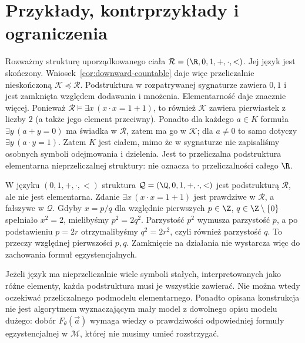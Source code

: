 \section{Przykłady, kontrprzykłady i ograniczenia}
\begin{przyklad}
\label{ex:ls-real-closed}
Rozważmy strukturę uporządkowanego ciała
$\mathcal R=(\R,0,1,+,\cdot,<)$.
Jej język jest skończony. Wniosek~\ref{cor:downward-countable}
daje więc przeliczalnie nieskończoną
$\mathcal K\preccurlyeq\mathcal R$.
Podstruktura w rozpatrywanej sygnaturze
zawiera $0,1$ i jest zamknięta
względem dodawania i mnożenia.
Elementarność daje znacznie więcej.
Ponieważ $\mathcal R\models\exists x\,(x\cdot x=1+1)$,
to również $\mathcal K$ zawiera pierwiastek
z liczby $2$ (a także jego element przeciwny).
Ponadto dla każdego $a\in K$
formuła $\exists y\,(a+y=0)$ ma świadka
w $\mathcal R$, zatem ma go w $\mathcal K$;
dla $a\ne0$ to samo dotyczy
$\exists y\,(a\cdot y=1)$.
Zatem $K$ jest ciałem, mimo że
w sygnaturze nie zapisaliśmy osobnych symboli
odejmowania i dzielenia.
Jest to przeliczalna podstruktura elementarna
nieprzeliczalnej struktury: nie oznacza to
przeliczalności całego $\R$.
\end{przyklad}

\begin{przyklad}
\label{ex:ls-q-not-elementary}
W języku $(0,1,+,\cdot,<)$ struktura
$\mathcal Q=(\Q,0,1,+,\cdot,<)$
jest podstrukturą $\mathcal R$,
ale nie jest elementarna.
Zdanie $\exists x\,(x\cdot x=1+1)$
jest prawdziwe w $\mathcal R$,
a fałszywe w $\mathcal Q$.
Gdyby $x=p/q$ dla względnie pierwszych
$p\in\Z$, $q\in\Z\setminus\{0\}$
spełniało $x^2=2$, mielibyśmy
$p^2=2q^2$. Parzystość $p^2$
wymusza parzystość $p$, a po podstawieniu
$p=2r$ otrzymalibyśmy $q^2=2r^2$,
czyli również parzystość $q$.
To przeczy względnej pierwszości $p,q$.
Zamknięcie na działania nie wystarcza więc
do zachowania formuł egzystencjalnych.
\end{przyklad}

\begin{uwaga}
\label{rem:ls-limitations}
Jeżeli język ma nieprzeliczalnie wiele
symboli stałych, interpretowanych jako różne
elementy, każda podstruktura musi je wszystkie
zawierać. Nie można wtedy oczekiwać
przeliczalnego podmodelu elementarnego.
Ponadto opisana konstrukcja nie jest algorytmem
wyznaczającym mały model z dowolnego
opisu modelu dużego: dobór
$F_\theta(\vec a)$ wymaga wiedzy
o prawdziwości odpowiedniej formuły
egzystencjalnej w $\mathcal M$, której
nie musimy umieć rozstrzygać.
\end{uwaga}
